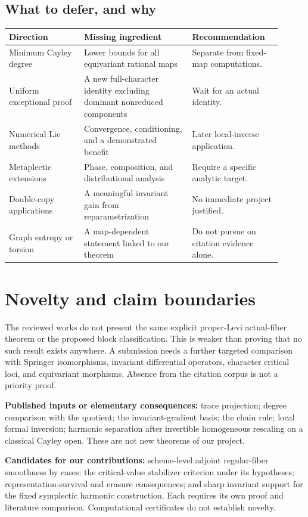 \subsection{What to defer, and why}
\begin{longtable}{>{\raggedright\arraybackslash}p{0.25\linewidth}>{\raggedright\arraybackslash}p{0.36\linewidth}>{\raggedright\arraybackslash}p{0.30\linewidth}}
\toprule Direction & Missing ingredient & Recommendation\\\midrule
Minimum Cayley degree & Lower bounds for all equivariant rational maps & Separate from fixed-map computations.\\
Uniform exceptional proof & A new full-character identity excluding dominant nonreduced components & Wait for an actual identity.\\
Numerical Lie methods & Convergence, conditioning, and a demonstrated benefit & Later local-inverse application.\\
Metaplectic extensions & Phase, composition, and distributional analysis & Require a specific analytic target.\\
Double-copy applications & A meaningful invariant gain from reparametrization & No immediate project justified.\\
Graph entropy or torsion & A map-dependent statement linked to our theorem & Do not pursue on citation evidence alone.\\\bottomrule
\end{longtable}

\section{Novelty and claim boundaries}
The reviewed works do not present the same explicit proper-Levi actual-fiber theorem or the proposed block classification. This is weaker than proving that no such result exists anywhere. A submission needs a further targeted comparison with Springer isomorphisms, invariant differential operators, character critical loci, and equivariant morphisms. Absence from the citation corpus is not a priority proof.

\textbf{Published inputs or elementary consequences:} trace projection; degree comparison with the quotient; the invariant-gradient basis; the chain rule; local formal inversion; harmonic separation after invertible homogeneous rescaling on a classical Cayley open. These are not new theorems of our project.

\textbf{Candidates for our contributions:} scheme-level adjoint regular-fiber smoothness by cases; the critical-value stabilizer criterion under its hypotheses; representation-survival and erasure consequences; and sharp invariant support for the fixed symplectic harmonic construction. Each requires its own proof and literature comparison. Computational certificates do not establish novelty.

